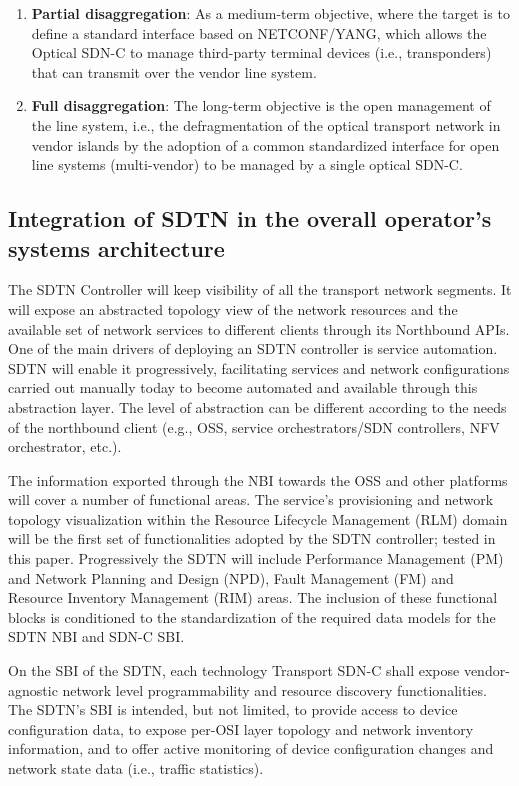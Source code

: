 \documentclass[a4paper,fleqn]{cas-dc}
\begin{document}
\begin{enumerate}
    \item \textbf{Partial disaggregation}: As a medium-term objective, where the target is to define a standard interface based on NETCONF/YANG, which allows the Optical SDN-C to manage third-party terminal devices (i.e., transponders) that can transmit over the vendor line system.
    
    \item \textbf{Full disaggregation}: The long-term objective is the open management of the line system, i.e., the defragmentation of the optical transport network in vendor islands by the adoption of a common standardized interface for open line systems (multi-vendor) to be managed by a single optical SDN-C.
\end{enumerate}

\subsection{Integration of SDTN in the overall operator’s systems architecture}
\label{section:sdtn}
The SDTN Controller will keep visibility of all the transport network segments. It will expose an abstracted topology view of the network resources and the available set of network services to different clients through its Northbound APIs.  
One of the main drivers of deploying an SDTN controller is service automation. SDTN will enable it progressively, facilitating services and network configurations carried out manually today to become automated and available through this abstraction layer.  The level of abstraction can be different according to the needs of the northbound client (e.g., OSS, service orchestrators/SDN controllers, NFV orchestrator, etc.). 

The information exported through the NBI towards the OSS and other platforms will cover a number of functional areas. The service’s provisioning and network topology visualization within the Resource Lifecycle Management (RLM) domain will be the first set of functionalities adopted by the SDTN controller; tested in this paper. Progressively the SDTN will include Performance Management (PM) and Network Planning and Design (NPD), Fault Management (FM) and Resource Inventory Management (RIM) areas. The inclusion of these functional blocks is conditioned to the standardization of the required data models for the SDTN NBI and SDN-C SBI.

On the SBI of the SDTN, each technology Transport SDN-C shall expose vendor-agnostic network level programmability and resource discovery functionalities. The SDTN's SBI is intended, but not limited, to provide access to device configuration data, to expose per-OSI layer topology and network inventory information, and to offer active monitoring of device configuration changes and network state data (i.e., traffic statistics). 
\end{document}
